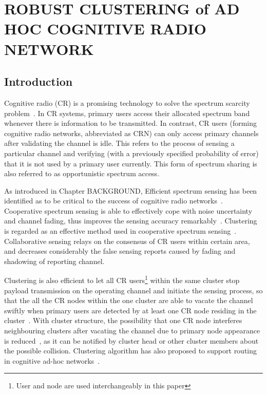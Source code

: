 \chapter{ROBUST CLUSTERING of AD HOC COGNITIVE RADIO NETWORK}
\section{Introduction}
\label{intro}
Cognitive radio (CR) is a promising technology to solve the spectrum scarcity problem~\cite{Mitola}. 
In CR systems, primary users access their allocated spectrum band whenever there is information to be transmitted. 
In contrast, CR users (forming cognitive radio networks, abbreviated as CRN) can only access primary channels after validating the channel is idle. 
This refers to the process of sensing a particular channel and verifying (with a previously specified probability of error) that it is not used by a primary user currently. 
This form of spectrum sharing is also referred to as opportunistic spectrum access.






As introduced in Chapter BACKGROUND, Efficient spectrum sensing has been identified as to be critical to the success of cognitive radio networks~\cite{Sahai_FundamentalDesignTradeoffs2006}.
Cooperative spectrum sensing is able to effectively cope with noise uncertainty and channel
fading, thus improves the sensing accuracy remarkably~\cite{Akyildiz_2011_CooperativeSpectrumSensing}.
Clustering is regarded as an effective method used in cooperative spectrum sensing~\cite{Sun07_clustering_spectrum_secsing, Zhao07}.
Collaborative sensing relays on the consensus of CR users within certain area, and decreases considerably the false sensing reports caused by fading and shadowing of reporting channel.

Clustering is also efficient to let all CR users\footnote{User and node are used interchangeably in this paper} within the same cluster stop payload transmission on the operating channel and initiate the sensing process, so that the all the CR nodes within the one cluster are able to vacate the channel swiftly when primary users are detected by at least one CR node residing in the cluster~\cite{willkomm08}.
With cluster structure, the possibility that one CR node interferes neighbouring clusters after vacating the channel due to primary node appearance is reduced~\cite{centralizedSharing80222}, as it can be notified by cluster head or other cluster members about the possible collision. 
Clustering algorithm has also proposed to support routing in cognitive ad-hoc networks~\cite{Abbasi_survey_07}.

